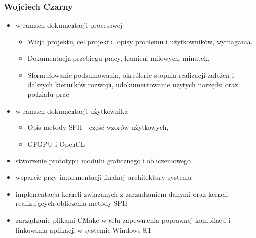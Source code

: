 \documentclass[polish, 12pt]{aghthesis}
\begin{document}
	\subsubsection*{Wojciech Czarny} 
		
		\begin{itemize}
			
			\item w ramach dokumentacji procesowej
			
				\begin{itemize}
				
					\item Wizja projektu, cel projektu, opisy problemu i użytkowników, wymagania.
					
					\item Dokumentacja przebiegu pracy, kamieni milowych, minutek.
					
					\item Sformułowanie podsumowania, określenie stopnia realizacji założeń i dalszych kierunków rozwoju, udokumentowanie użytych narzędzi oraz podziału prac
				
				\end{itemize}
			
			\item w ramach dokumentacji użytkownika
			
				\begin{itemize}
				
					\item Opis metody SPH - część wzorów użytkowych, 
					
					\item GPGPU i OpenCL
				
				\end{itemize}
			
			\item stworzenie prototypu modułu graficznego i obliczeniowego
			
			\item wsparcie przy implementacji finalnej architektury systemu
			
			\item implementacja kerneli związanych z zarządzaniem danymi oraz kerneli realizujących obliczenia metody SPH
					
			\item zarządzanie plikami CMake w celu zapewnienia poprawnej kompilacji i linkowania aplikacji w systemie Windows 8.1
		
		\end{itemize}
		
\end{document}
